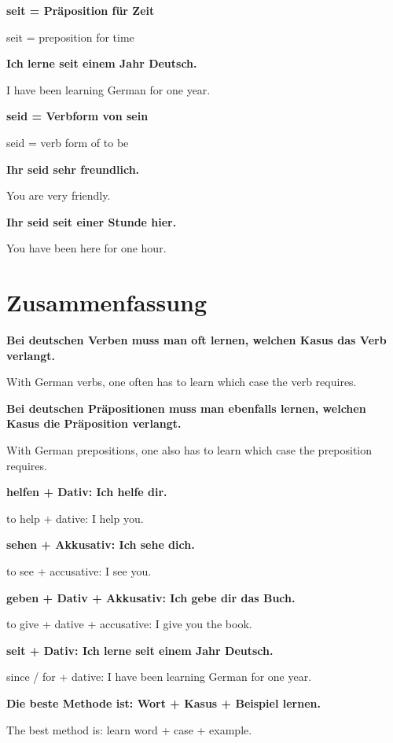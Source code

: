 \documentclass[a4paper]{article}
\newcommand{\EN}[1]{\par{\small\textcolor{TranslationGray}{#1}}\vspace{0.4em}}
\begin{document}
            \textbf{seit = Präposition für Zeit}
            \EN{seit = preposition for time}
            
            \textbf{Ich lerne seit einem Jahr Deutsch.}
            \EN{I have been learning German for one year.}
            
            \textbf{seid = Verbform von sein}
            \EN{seid = verb form of to be}
            
            \textbf{Ihr seid sehr freundlich.}
            \EN{You are very friendly.}
            
            \textbf{Ihr seid seit einer Stunde hier.}
            \EN{You have been here for one hour.}
    
    
    \section{Zusammenfassung}
        
        \textbf{Bei deutschen Verben muss man oft lernen, welchen Kasus das Verb verlangt.}
        \EN{With German verbs, one often has to learn which case the verb requires.}
        
        \textbf{Bei deutschen Präpositionen muss man ebenfalls lernen, welchen Kasus die Präposition verlangt.}
        \EN{With German prepositions, one also has to learn which case the preposition requires.}
        
        \textbf{helfen + Dativ: Ich helfe dir.}
        \EN{to help + dative: I help you.}
        
        \textbf{sehen + Akkusativ: Ich sehe dich.}
        \EN{to see + accusative: I see you.}
        
        \textbf{geben + Dativ + Akkusativ: Ich gebe dir das Buch.}
        \EN{to give + dative + accusative: I give you the book.}
        
        \textbf{seit + Dativ: Ich lerne seit einem Jahr Deutsch.}
        \EN{since / for + dative: I have been learning German for one year.}
        
        \textbf{Die beste Methode ist: Wort + Kasus + Beispiel lernen.}
        \EN{The best method is: learn word + case + example.}
        
%        
%        
\end{document}
